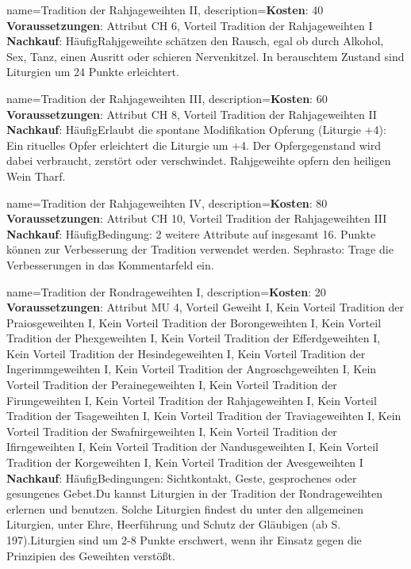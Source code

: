 {
    name={Tradition der Rahjageweihten II},
    description={\textbf{Kosten}: 40 \textbf{Voraussetzungen}: Attribut CH 6, Vorteil Tradition der Rahjageweihten I \textbf{Nachkauf}: Häufig\newline Rahjgeweihte schätzen den Rausch, egal ob durch Alkohol, Sex, Tanz, einen Ausritt oder schieren Nervenkitzel. In berauschtem Zustand sind Liturgien um 2­4 Punkte erleichtert.}
}


{
    name={Tradition der Rahjageweihten III},
    description={\textbf{Kosten}: 60 \textbf{Voraussetzungen}: Attribut CH 8, Vorteil Tradition der Rahjageweihten II \textbf{Nachkauf}: Häufig\newline Erlaubt die spontane Modifikation Opferung (Liturgie +4): Ein rituelles Opfer erleichtert die Liturgie um +4. Der Opfergegenstand wird dabei verbraucht, zerstört oder verschwindet. Rahjgeweihte opfern den heiligen Wein Tharf.}
}


{
    name={Tradition der Rahjageweihten IV},
    description={\textbf{Kosten}: 80 \textbf{Voraussetzungen}: Attribut CH 10, Vorteil Tradition der Rahjageweihten III \textbf{Nachkauf}: Häufig\newline Bedingung: 2 weitere Attribute auf insgesamt 16. Punkte können zur Verbesserung der Tradition verwendet werden. Sephrasto: Trage die Verbesserungen in das Kommentarfeld ein.}
}


{
    name={Tradition der Rondrageweihten I},
    description={\textbf{Kosten}: 20 \textbf{Voraussetzungen}: Attribut MU 4, Vorteil Geweiht I, Kein Vorteil Tradition der Praiosgeweihten I, Kein Vorteil Tradition der Borongeweihten I, Kein Vorteil Tradition der Phexgeweihten I, Kein Vorteil Tradition der Efferdgeweihten I, Kein Vorteil Tradition der Hesindegeweihten I, Kein Vorteil Tradition der Ingerimmgeweihten I, Kein Vorteil Tradition der Angroschgeweihten I, Kein Vorteil Tradition der Perainegeweihten I, Kein Vorteil Tradition der Firungeweihten I, Kein Vorteil Tradition der Rahjageweihten I, Kein Vorteil Tradition der Tsageweihten I, Kein Vorteil Tradition der Traviageweihten I, Kein Vorteil Tradition der Swafnirgeweihten I, Kein Vorteil Tradition der Ifirngeweihten I, Kein Vorteil Tradition der Nandusgeweihten I, Kein Vorteil Tradition der Korgeweihten I, Kein Vorteil Tradition der Avesgeweihten I \textbf{Nachkauf}: Häufig\newline Bedingungen: Sichtkontakt, Geste, gesprochenes oder gesungenes Gebet.\newline Du kannst Liturgien in der Tradition der Rondrageweihten erlernen und benutzen. Solche Liturgien findest du unter den allgemeinen Liturgien, unter Ehre, Heerführung und Schutz der Gläubigen (ab S. 197).\newline Liturgien sind um 2-8 Punkte erschwert, wenn ihr Einsatz gegen die Prinzipien des Geweihten verstößt.}
}



